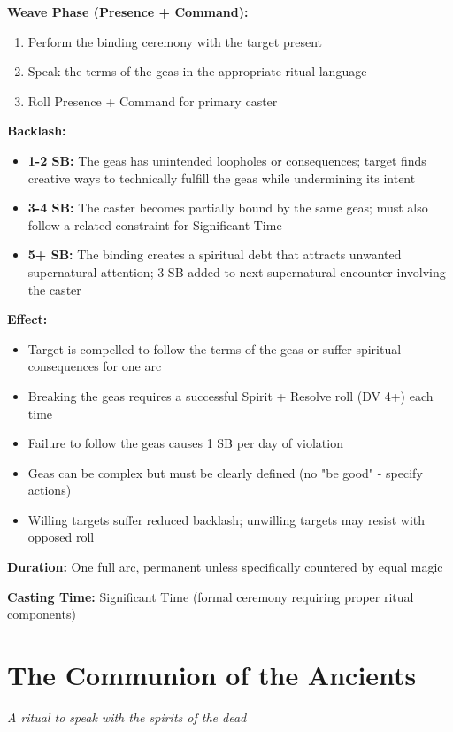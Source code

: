 \textbf{Weave Phase (Presence + Command):}
\begin{enumerate}
\item Perform the binding ceremony with the target present
\item Speak the terms of the geas in the appropriate ritual language
\item Roll Presence + Command for primary caster
\end{enumerate}

\textbf{Backlash:}
\begin{itemize}
\item \textbf{1-2 SB:} The geas has unintended loopholes or consequences; target finds creative ways to technically fulfill the geas while undermining its intent
\item \textbf{3-4 SB:} The caster becomes partially bound by the same geas; must also follow a related constraint for Significant Time
\item \textbf{5+ SB:} The binding creates a spiritual debt that attracts unwanted supernatural attention; 3 SB added to next supernatural encounter involving the caster
\end{itemize}

\textbf{Effect:}
\begin{itemize}
\item Target is compelled to follow the terms of the geas or suffer spiritual consequences for one arc
\item Breaking the geas requires a successful Spirit + Resolve roll (DV 4+) each time
\item Failure to follow the geas causes 1 SB per day of violation
\item Geas can be complex but must be clearly defined (no "be good" - specify actions)
\item Willing targets suffer reduced backlash; unwilling targets may resist with opposed roll
\end{itemize}

\textbf{Duration:} One full arc, permanent unless specifically countered by equal magic

\textbf{Casting Time:} Significant Time (formal ceremony requiring proper ritual components)

\section*{The Communion of the Ancients}
\textit{A ritual to speak with the spirits of the dead}


